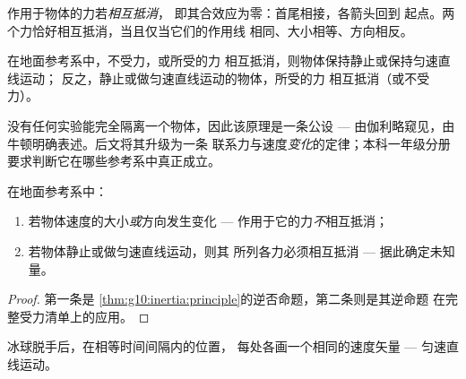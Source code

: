\begin{definition}[相互抵消的力]\label{def:g10:inertia:compensate}
作用于物体的力若\emph{相互抵消}，
即其合效应为零：首尾相接，各箭头回到
起点。两个力恰好相互抵消，当且仅当它们的作用线
相同、大小相等、方向相反。
\end{definition}

\begin{theorem}[惯性原理]\label{thm:g10:inertia:principle}
在地面参考系中，不受力，或所受的力
相互抵消，则物体保持静止或保持匀速直线运动；
反之，静止或做匀速直线运动的物体，所受的力
相互抵消（或不受力）。
\end{theorem}
\admitted

\begin{remark}
没有任何实验能完全隔离一个物体，因此该原理是一条公设
--- 由伽利略窥见，由牛顿明确表述。后文将其升级为一条
联系力与速度\emph{变化}的定律；本科一年级分册
要求判断它在哪些参考系中真正成立。
\end{remark}

\begin{proposition}\label{prop:g10:inertia:converse}
在地面参考系中：
\begin{enumerate}
  \item 若物体速度的大小\emph{或}方向发生变化 ---
        作用于它的力\emph{不}相互抵消；
  \item 若物体静止或做匀速直线运动，则其
        所列各力必须相互抵消 --- 据此确定未知量。
\end{enumerate}
\end{proposition}

\begin{proof}
第一条是
\cref{thm:g10:inertia:principle}的逆否命题，第二条则是其逆命题
在完整受力清单上的应用。
\end{proof}

\begin{omfigure}

{\small 冰球脱手后，在相等时间间隔内的位置，
每处各画一个相同的速度矢量 --- 匀速直线运动。}
\end{omfigure}

